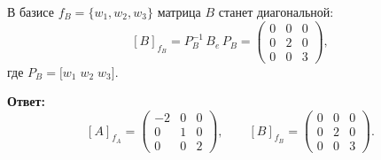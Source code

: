 \documentclass[12pt]{article}
\begin{document}
В базисе \(f_B=\{w_1,w_2,w_3\}\) матрица \(B\) станет диагональной:
\[
	[B]_{f_B}
	= P_B^{-1}\,B_e\,P_B
	= \begin{pmatrix}
		0 & 0 & 0 \\
		0 & 2 & 0 \\
		0 & 0 & 3
	\end{pmatrix},
\]
где \(P_B = \bigl[w_1\;w_2\;w_3\bigr]\).

\textbf{Ответ:}
\[
	[A]_{f_A}
	= \begin{pmatrix}
		-2 & 0 & 0 \\
		0  & 1 & 0 \\
		0  & 0 & 2
	\end{pmatrix},
	\qquad
	[B]_{f_B}
	= \begin{pmatrix}
		0 & 0 & 0 \\
		0 & 2 & 0 \\
		0 & 0 & 3
	\end{pmatrix}.
\]
\end{document}
